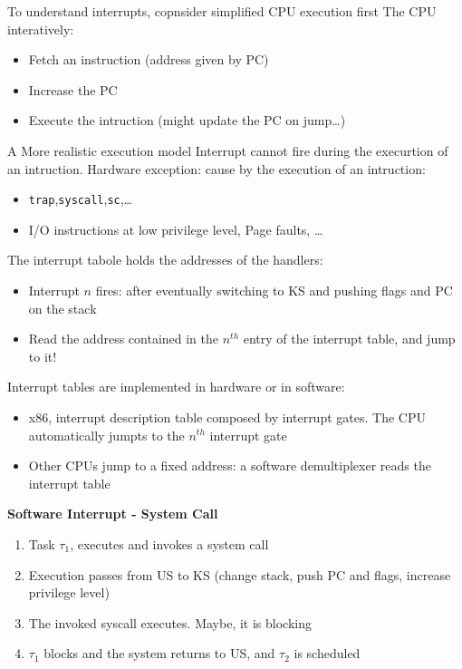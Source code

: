To understand interrupts, copnsider simplified CPU execution first
The CPU interatively:
\begin{itemize}
    \item Fetch an instruction (address given by PC)
    \item Increase the PC
    \item Execute the intruction (might update the PC on jump\dots)
\end{itemize}

A More realistic execution model
Interrupt cannot fire during the execurtion of an intruction.
Hardware exception: cause by the execution of an intruction:
\begin{itemize}
    \item \texttt{trap},\texttt{syscall},\texttt{sc},\dots
    \item I/O instructions at low privilege level, Page faults, \dots
\end{itemize}

The interrupt tabole holds the addresses of the handlers:
\begin{itemize}
    \item Interrupt $n$ fires: after eventually switching to KS and pushing flags and PC on the stack
    \item Read the address contained in the $n^{th}$ entry of the interrupt table, and jump to it!
\end{itemize}

Interrupt tables are implemented in hardware or in software:
\begin{itemize}
    \item x86, interrupt description table composed by interrupt gates. The CPU automatically jumpts to the $n^{th}$ interrupt gate
    \item Other CPUs jump to a fixed address: a software demultiplexer reads the interrupt table
\end{itemize}
 

\textbf{Software Interrupt - System Call}
\begin{enumerate}
    \item Task $\tau_1$, executes and invokes a system call
    \item Execution passes from US to KS (change stack, push PC and flags, increase privilege level)
    \item The invoked syscall executes. Maybe, it is blocking
    \item $\tau_1$ blocks and the system returns to US, and $\tau_2$ is scheduled
\end{enumerate}

